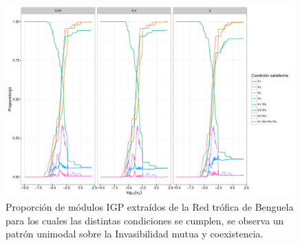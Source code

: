 \begin{figure}[!htbp]
  \centering
  \includegraphics[width = 0.99\textwidth]{./Plots/DataAna.pdf}
  \caption[Empirica]{Proporci\'on de m\'odulos IGP extra\'idos de la Red tr\'ofica de Benguela para los cuales las distintas condiciones se cumplen, se observa un patr\'on unimodal sobre la Invasibilidad mutua y coexistencia.}
  \label{fig:DataAna}
\end{figure}







